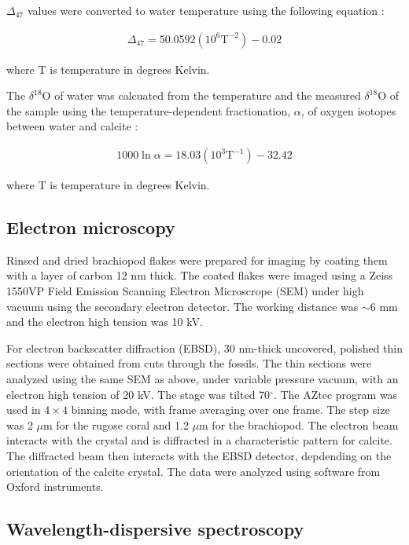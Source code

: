 \documentclass{article}
\newcommand{\deltao}{$\delta^{18}$}
\begin{document}
$\Delta_{47}$ values were converted to water temperature using the following equation \citep{Ghosh2006}:

\begin{align}
\Delta_{47}=50.0592\left(10^6\text{T}^{-2}\right)-0.02
\end{align}

\noindent where T is temperature in degrees Kelvin. 

The \deltao O of water was calcuated from the temperature and the measured \deltao O of the sample using the temperature-dependent fractionation, $\alpha$, of oxygen isotopes between water and calcite \citep{Kim1997}:

\begin{align}
1000\ln\alpha=18.03\left(10^3\text{T}^{-1}\right)-32.42
\end{align}

\noindent where T is temperature in degrees Kelvin. 

\subsection{Electron microscopy}

Rinsed and dried brachiopod flakes were prepared for imaging by coating them with a layer of carbon 12 nm thick. The coated flakes were imaged using a Zeiss 1550VP Field Emission Scanning Electron Microscrope (SEM) under high vacuum using the secondary electron detector. The working distance was $\sim 6$ mm and the electron high tension was 10 kV. 

For electron backscatter diffraction (EBSD), 30 nm-thick uncovered, polished thin sections were obtained from cuts through the fossils. The thin sections were analyzed using the same SEM as above, under variable pressure vacuum, with an electron high tension of 20 kV. The stage was tilted 70$^{\circ}$. The AZtec program was used in $4\times4$ binning mode, with frame averaging over one frame. The step size was 2 $\mu$m for the rugose coral and 1.2 $\mu$m for the brachiopod. The electron beam interacts with the crystal and is diffracted in a characteristic pattern for calcite. The diffracted beam then interacts with the EBSD detector, depdending on the orientation of the calcite crystal. The data were analyzed using software from Oxford instruments.

\subsection{Wavelength-dispersive spectroscopy}
\end{document}
